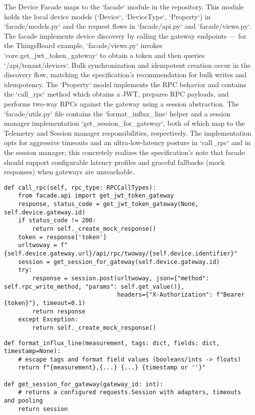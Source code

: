\documentclass[11pt,a4paper]{article}
\begin{document}
The Device Facade maps to the `facade` module in the repository. This module holds the local device models (`Device`, `DeviceType`, `Property`) in `facade/models.py` and the request flows in `facade/api.py` and `facade/views.py`. The facade implements device discovery by calling the gateway endpoints — for the ThingsBoard example, `facade/views.py` invokes `core.get_jwt_token_gateway` to obtain a token and then queries `/api/tenant/devices`. Bulk synchronization and idempotent creation occur in the discovery flow, matching the specification's recommendation for bulk writes and idempotency. The `Property` model implements the RPC behavior and contains the `call_rpc` method which obtains a JWT, prepares RPC payloads, and performs two-way RPCs against the gateway using a session abstraction. The `facade/utils.py` file contains the `format_influx_line` helper and a session manager implementation `get_session_for_gateway`, both of which map to the Telemetry and Session manager responsibilities, respectively. The implementation opts for aggressive timeouts and an ultra-low-latency posture in `call_rpc` and in the session manager; this concretely realizes the specification's note that facade should support configurable latency profiles and graceful fallbacks (mock responses) when gateways are unreachable.

\begin{lstlisting}[style=pythonstyle,caption={Property.call_rpc (facade/models.py) - simplified}]
def call_rpc(self, rpc_type: RPCCallTypes):
	from facade.api import get_jwt_token_gateway
	response, status_code = get_jwt_token_gateway(None, self.device.gateway.id)
	if status_code != 200:
		return self._create_mock_response()
	token = response['token']
	urltwoway = f"{self.device.gateway.url}/api/rpc/twoway/{self.device.identifier}"
	session = get_session_for_gateway(self.device.gateway.id)
	try:
		response = session.post(urltwoway, json={"method": self.rpc_write_method, "params": self.get_value()},
								headers={"X-Authorization": f"Bearer {token}"}, timeout=0.1)
		return response
	except Exception:
		return self._create_mock_response()
\end{lstlisting}

\begin{lstlisting}[style=pythonstyle,caption={format_influx_line and get_session_for_gateway (facade/utils.py) - sketches}]
def format_influx_line(measurement, tags: dict, fields: dict, timestamp=None):
	# escape tags and format field values (booleans/ints -> floats)
	return f"{measurement},{...} {...} {timestamp or ''}"

def get_session_for_gateway(gateway_id: int):
	# returns a configured requests.Session with adapters, timeouts and pooling
	return session
\end{lstlisting}
\end{document}
